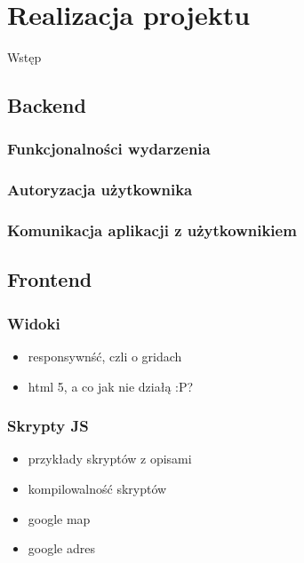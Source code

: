 \section{Realizacja projektu}
Wstęp
  \subsection{Backend}
    \subsubsection{Funkcjonalności wydarzenia}
    \subsubsection{Autoryzacja użytkownika}
    \subsubsection{Komunikacja aplikacji z użytkownikiem}
  \subsection{Frontend}
    \subsubsection{Widoki}
      \begin{itemize}
        \item responsywnść, czli o gridach
        \item html 5, a co jak nie działą :P?
      \end{itemize}
    \subsubsection{Skrypty JS}
      \begin{itemize}
        \item przykłady skryptów z opisami
        \item kompilowalność skryptów
        \item google map
        \item google adres
      \end{itemize}

